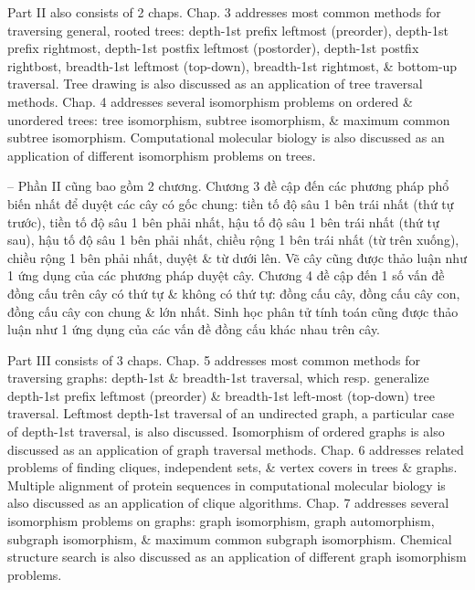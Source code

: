 \documentclass{article}
\begin{document}
\begin{itemize}
	Part II also consists of 2 chaps. Chap. 3 addresses most common methods for traversing general, rooted trees: depth-1st prefix leftmost (preorder), depth-1st prefix rightmost, depth-1st postfix leftmost (postorder), depth-1st postfix rightbost, breadth-1st leftmost (top-down), breadth-1st rightmost, \& bottom-up traversal. Tree drawing is also discussed as an application of tree traversal methods. Chap. 4 addresses several isomorphism problems on ordered \& unordered trees: tree isomorphism, subtree isomorphism, \& maximum common subtree isomorphism. Computational molecular biology is also discussed as an application of different isomorphism problems on trees.
	
	-- Phần II cũng bao gồm 2 chương. Chương 3 đề cập đến các phương pháp phổ biến nhất để duyệt các cây có gốc chung: tiền tố độ sâu 1 bên trái nhất (thứ tự trước), tiền tố độ sâu 1 bên phải nhất, hậu tố độ sâu 1 bên trái nhất (thứ tự sau), hậu tố độ sâu 1 bên phải nhất, chiều rộng 1 bên trái nhất (từ trên xuống), chiều rộng 1 bên phải nhất, duyệt \& từ dưới lên. Vẽ cây cũng được thảo luận như 1 ứng dụng của các phương pháp duyệt cây. Chương 4 đề cập đến 1 số vấn đề đồng cấu trên cây có thứ tự \& không có thứ tự: đồng cấu cây, đồng cấu cây con, đồng cấu cây con chung \& lớn nhất. Sinh học phân tử tính toán cũng được thảo luận như 1 ứng dụng của các vấn đề đồng cấu khác nhau trên cây.
	
	Part III consists of 3 chaps. Chap. 5 addresses most common methods for traversing graphs: depth-1st \& breadth-1st traversal, which resp. generalize depth-1st prefix leftmost (preorder) \& breadth-1st left-most (top-down) tree traversal. Leftmost depth-1st traversal of an undirected graph, a particular case of depth-1st traversal, is also discussed. Isomorphism of ordered graphs is also discussed as an application of graph traversal methods. Chap. 6 addresses related problems of finding cliques, independent sets, \& vertex covers in trees \& graphs. Multiple alignment of protein sequences in computational molecular biology is also discussed as an application of clique algorithms. Chap. 7 addresses several isomorphism problems on graphs: graph isomorphism, graph automorphism, subgraph isomorphism, \& maximum common subgraph isomorphism. Chemical structure search is also discussed as an application of different graph isomorphism problems.
	

\end{itemize}
\end{document}
